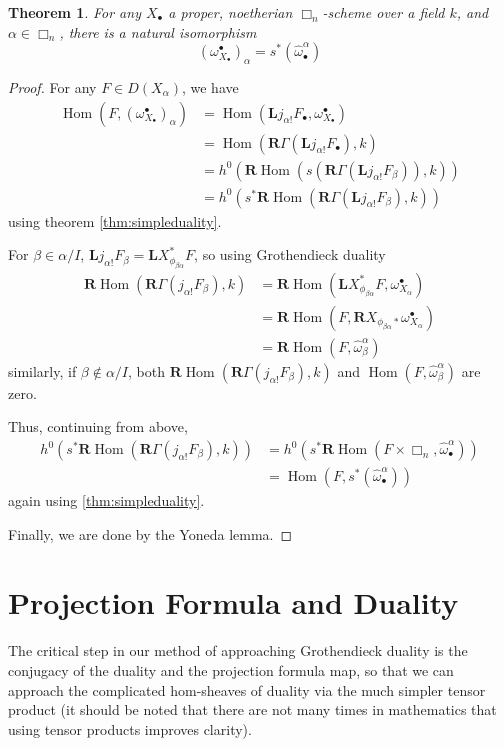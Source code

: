 \documentclass[proquest]{uwthesis}[2014/11/13]
\newtheorem{theorem}{Theorem}[section]
\theoremstyle{definition}
\DeclareMathOperator{\Hom}{Hom}
\newcommand{\bL}{\textbf{L}}
\newcommand{\bR}{\textbf{R}}
\begin{document}
\begin{theorem}
	For any $X_\bullet$ a proper, noetherian $\Box_n$-scheme over a field $k$, and $\alpha \in \Box_n$, there is a natural isomorphism
	\[
		(\omega_{X_\bullet}^\bullet)_\alpha = s^*(\hat{\omega}^\alpha_\bullet)
	\]
\end{theorem}
\begin{proof}
	For any $F \in D(X_\alpha)$, we have 
	\begin{align*}
	\Hom(F, (\omega_{X_\bullet}^\bullet)_\alpha) &= \Hom(\bL j_{\alpha !} F_\bullet, \omega_{X_\bullet}^\bullet) \\
	&= \Hom(\bR \Gamma(\bL j_{\alpha !} F_\bullet), k) \\
	&= h^0(\bR \Hom(s(\bR \Gamma (\bL j_{\alpha !} F_\beta)),k)) \\
	&= h^0(s^* \bR \Hom(\bR \Gamma(\bL j_{\alpha !} F_\beta), k))
	\end{align*}
	using theorem \ref{thm:simpleduality}.
	
	For $\beta \in \alpha / I$, $\bL j_{\alpha !} F_\beta = \bL X_{\phi_{\beta \alpha}}^* F$, so using Grothendieck duality
	\begin{align*}
		\bR \Hom(\bR \Gamma(j_{\alpha !} F_\beta),k)  &= \bR \Hom(\bL X_{\phi_{\beta \alpha}}^* F, \omega_{X_\alpha}^\bullet) \\
		&= \bR \Hom(F, \bR X_{\phi_{\beta \alpha} *} \omega_{X_\alpha}^\bullet) \\
		&= \bR \Hom(F, \hat{\omega}^\alpha_\beta)
	\end{align*}
	similarly, if $\beta \not \in \alpha / I$, both $\bR \Hom(\bR \Gamma(j_{\alpha !} F_\beta), k)$ and $\Hom(F, \hat{\omega}^\alpha_\beta)$ are zero.
	
	Thus, continuing from above,
	\begin{align*}
		h^0(s^* \bR \Hom(\bR \Gamma(j_{\alpha !} F_\beta), k)) &= h^0(s^* \bR \Hom(F \times \Box_n, \hat{\omega}^\alpha_\bullet)) \\
		&= \Hom(F, s^*(\hat{\omega}^\alpha_\bullet))
	\end{align*}
	again using \ref{thm:simpleduality}.
	
	Finally, we are done by the Yoneda lemma.
\end{proof}

\section{Projection Formula and Duality}

The critical step in our method of approaching Grothendieck duality is the conjugacy of the duality and the projection formula map, so that we can approach the complicated hom-sheaves of duality via the much simpler tensor product (it should be noted that there are not many times in mathematics that using tensor products improves clarity).
\end{document}
